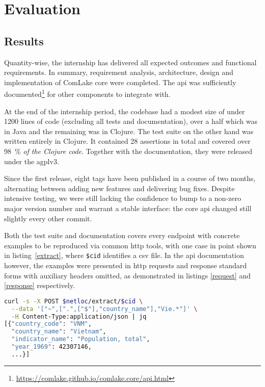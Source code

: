 \chapter{Evaluation}
\section{Results}
Quantity-wise, the internship has delivered
all expected outcomes and functional requirements.  In summary,
requirement analysis, architecture, design and implementation
of ComLake core were completed.  The \gls{api} was sufficiently
documented\footnote{\url{https://comlake.github.io/comlake.core/api.html}}
for other components to integrate with.

At the end of the internship period, the codebase had a modest size of under
1200 lines of code (excluding all tests and documentation), over a half which
was in Java and the remaining was in Clojure.  The test suite on the other hand
was written entirely in Clojure.  It contained 28 assertions in total
and covered over \SI{98}{\percent} \emph{of the Clojure code}.  Together with
the documentation, they were released under the \gls{agplv3}.

Since the first release, eight tags have been published in a course
of two months, alternating between adding new features and delivering
bug fixes.  Despite intensive testing, we were still lacking the confidence
to bump to a non-zero major version number and warrant a stable interface:
the core \gls{api} changed still slightly every other commit.

Both the test suite and documentation covers every endpoint with concrete
examples to be reproduced via common \gls{http} tools, with one case
in point shown in listing~\ref{extract}, where \verb|$cid| identifies
a \gls{csv} file.  In the \gls{api} documentation however, the examples
were presented in \gls{http} requests and response standard forms
with auxiliary headers omitted, as demonstrated in listings \ref{request}
and \ref{response} respectively.

\begin{lstlisting}[label=extract,caption=Using \texttt{curl} and \texttt{jq}
  to extract data from the core service,language=sh]
curl -s -X POST $netloc/extract/$cid \
  --data '["~",[".",["$"],"country_name"],"Vie.*"]' \
  -H Content-Type:application/json | jq
[{"country_code": "VNM",
  "country_name": "Vietnam",
  "indicator_name": "Population, total",
  "year_1969": 42307146,
  ...}]
\end{lstlisting}

